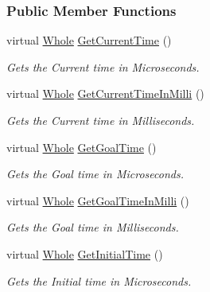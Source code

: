 \subsubsection*{Public Member Functions}
\begin{DoxyCompactItemize}
\item 
virtual \hyperlink{namespacephys_a460f6bc24c8dd347b05e0366ae34f34a}{Whole} \hyperlink{classphys_1_1SimpleTimer_aa0cda0797bfb501240016177ff1450a5}{GetCurrentTime} ()
\begin{DoxyCompactList}\small\item\em Gets the Current time in Microseconds. \item\end{DoxyCompactList}\item 
virtual \hyperlink{namespacephys_a460f6bc24c8dd347b05e0366ae34f34a}{Whole} \hyperlink{classphys_1_1SimpleTimer_a334e151fd080489c1704abd3039b1843}{GetCurrentTimeInMilli} ()
\begin{DoxyCompactList}\small\item\em Gets the Current time in Milliseconds. \item\end{DoxyCompactList}\item 
virtual \hyperlink{namespacephys_a460f6bc24c8dd347b05e0366ae34f34a}{Whole} \hyperlink{classphys_1_1SimpleTimer_a37b29b36164f5538988df955fd46e89b}{GetGoalTime} ()
\begin{DoxyCompactList}\small\item\em Gets the Goal time in Microseconds. \item\end{DoxyCompactList}\item 
virtual \hyperlink{namespacephys_a460f6bc24c8dd347b05e0366ae34f34a}{Whole} \hyperlink{classphys_1_1SimpleTimer_a69b08da65148ea36b62d9d0f672e8325}{GetGoalTimeInMilli} ()
\begin{DoxyCompactList}\small\item\em Gets the Goal time in Milliseconds. \item\end{DoxyCompactList}\item 
virtual \hyperlink{namespacephys_a460f6bc24c8dd347b05e0366ae34f34a}{Whole} \hyperlink{classphys_1_1SimpleTimer_a6d56952c8b2f2e3405a1bc2cc3b8a833}{GetInitialTime} ()
\begin{DoxyCompactList}\small\item\em Gets the Initial time in Microseconds. \item\end{DoxyCompactList}\item 

\end{DoxyCompactItemize}
